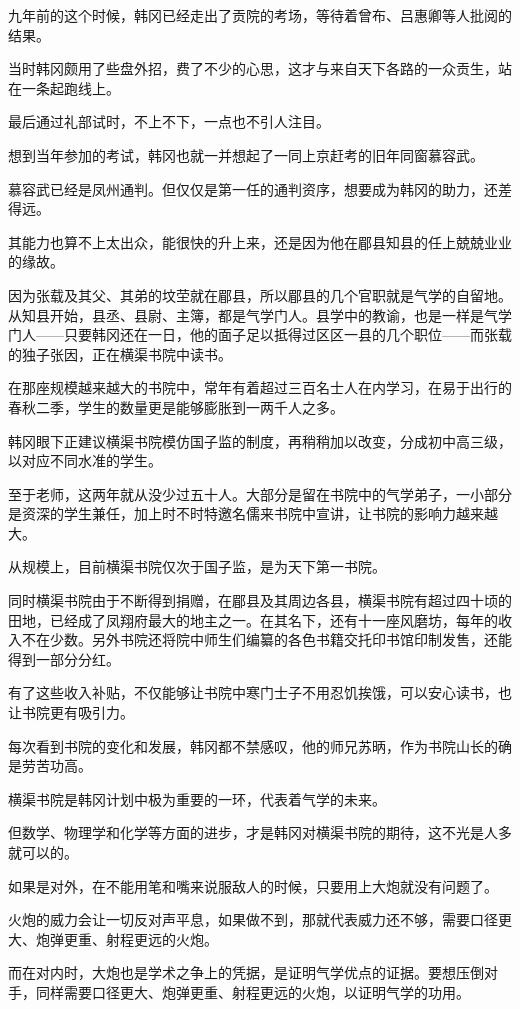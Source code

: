 九年前的这个时候，韩冈已经走出了贡院的考场，等待着曾布、吕惠卿等人批阅的结果。

当时韩冈颇用了些盘外招，费了不少的心思，这才与来自天下各路的一众贡生，站在一条起跑线上。

最后通过礼部试时，不上不下，一点也不引人注目。

想到当年参加的考试，韩冈也就一并想起了一同上京赶考的旧年同窗慕容武。

慕容武已经是凤州通判。但仅仅是第一任的通判资序，想要成为韩冈的助力，还差得远。

其能力也算不上太出众，能很快的升上来，还是因为他在郿县知县的任上兢兢业业的缘故。

因为张载及其父、其弟的坟茔就在郿县，所以郿县的几个官职就是气学的自留地。从知县开始，县丞、县尉、主簿，都是气学门人。县学中的教谕，也是一样是气学门人——只要韩冈还在一日，他的面子足以抵得过区区一县的几个职位——而张载的独子张因，正在横渠书院中读书。

在那座规模越来越大的书院中，常年有着超过三百名士人在内学习，在易于出行的春秋二季，学生的数量更是能够膨胀到一两千人之多。

韩冈眼下正建议横渠书院模仿国子监的制度，再稍稍加以改变，分成初中高三级，以对应不同水准的学生。

至于老师，这两年就从没少过五十人。大部分是留在书院中的气学弟子，一小部分是资深的学生兼任，加上时不时特邀名儒来书院中宣讲，让书院的影响力越来越大。

从规模上，目前横渠书院仅次于国子监，是为天下第一书院。

同时横渠书院由于不断得到捐赠，在郿县及其周边各县，横渠书院有超过四十顷的田地，已经成了凤翔府最大的地主之一。在其名下，还有十一座风磨坊，每年的收入不在少数。另外书院还将院中师生们编纂的各色书籍交托印书馆印制发售，还能得到一部分分红。

有了这些收入补贴，不仅能够让书院中寒门士子不用忍饥挨饿，可以安心读书，也让书院更有吸引力。

每次看到书院的变化和发展，韩冈都不禁感叹，他的师兄苏昞，作为书院山长的确是劳苦功高。

横渠书院是韩冈计划中极为重要的一环，代表着气学的未来。

但数学、物理学和化学等方面的进步，才是韩冈对横渠书院的期待，这不光是人多就可以的。

如果是对外，在不能用笔和嘴来说服敌人的时候，只要用上大炮就没有问题了。

火炮的威力会让一切反对声平息，如果做不到，那就代表威力还不够，需要口径更大、炮弹更重、射程更远的火炮。

而在对内时，大炮也是学术之争上的凭据，是证明气学优点的证据。要想压倒对手，同样需要口径更大、炮弹更重、射程更远的火炮，以证明气学的功用。

